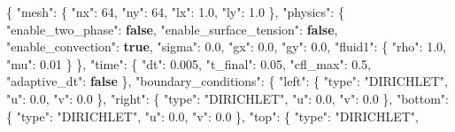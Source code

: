 \documentclass[
  10pt,
]{article}
\newenvironment{Shaded}{}{}
\newcommand{\DataTypeTok}[1]{\textcolor[rgb]{0.56,0.13,0.00}{#1}}
\newcommand{\DecValTok}[1]{\textcolor[rgb]{0.25,0.63,0.44}{#1}}
\newcommand{\FloatTok}[1]{\textcolor[rgb]{0.25,0.63,0.44}{#1}}
\newcommand{\FunctionTok}[1]{\textcolor[rgb]{0.02,0.16,0.49}{#1}}
\newcommand{\KeywordTok}[1]{\textcolor[rgb]{0.00,0.44,0.13}{\textbf{#1}}}
\newcommand{\StringTok}[1]{\textcolor[rgb]{0.25,0.44,0.63}{#1}}
\begin{document}
\begin{Shaded}
\begin{Highlighting}[]
\FunctionTok{\{}
  \DataTypeTok{"mesh"}\FunctionTok{:} \FunctionTok{\{}
    \DataTypeTok{"nx"}\FunctionTok{:} \DecValTok{64}\FunctionTok{,}
    \DataTypeTok{"ny"}\FunctionTok{:} \DecValTok{64}\FunctionTok{,}
    \DataTypeTok{"lx"}\FunctionTok{:} \FloatTok{1.0}\FunctionTok{,}
    \DataTypeTok{"ly"}\FunctionTok{:} \FloatTok{1.0}
  \FunctionTok{\},}
  \DataTypeTok{"physics"}\FunctionTok{:} \FunctionTok{\{}
    \DataTypeTok{"enable\_two\_phase"}\FunctionTok{:} \KeywordTok{false}\FunctionTok{,}
    \DataTypeTok{"enable\_surface\_tension"}\FunctionTok{:} \KeywordTok{false}\FunctionTok{,}
    \DataTypeTok{"enable\_convection"}\FunctionTok{:} \KeywordTok{true}\FunctionTok{,}
    \DataTypeTok{"sigma"}\FunctionTok{:} \FloatTok{0.0}\FunctionTok{,}
    \DataTypeTok{"gx"}\FunctionTok{:} \FloatTok{0.0}\FunctionTok{,}
    \DataTypeTok{"gy"}\FunctionTok{:} \FloatTok{0.0}\FunctionTok{,}
    \DataTypeTok{"fluid1"}\FunctionTok{:} \FunctionTok{\{}
      \DataTypeTok{"rho"}\FunctionTok{:} \FloatTok{1.0}\FunctionTok{,}
      \DataTypeTok{"mu"}\FunctionTok{:} \FloatTok{0.01}
    \FunctionTok{\}}
  \FunctionTok{\},}
  \DataTypeTok{"time"}\FunctionTok{:} \FunctionTok{\{}
    \DataTypeTok{"dt"}\FunctionTok{:} \FloatTok{0.005}\FunctionTok{,}
    \DataTypeTok{"t\_final"}\FunctionTok{:} \FloatTok{0.05}\FunctionTok{,}
    \DataTypeTok{"cfl\_max"}\FunctionTok{:} \FloatTok{0.5}\FunctionTok{,}
    \DataTypeTok{"adaptive\_dt"}\FunctionTok{:} \KeywordTok{false}
  \FunctionTok{\},}
  \DataTypeTok{"boundary\_conditions"}\FunctionTok{:} \FunctionTok{\{}
    \DataTypeTok{"left"}\FunctionTok{:} \FunctionTok{\{}
      \DataTypeTok{"type"}\FunctionTok{:} \StringTok{"DIRICHLET"}\FunctionTok{,}
      \DataTypeTok{"u"}\FunctionTok{:} \FloatTok{0.0}\FunctionTok{,}
      \DataTypeTok{"v"}\FunctionTok{:} \FloatTok{0.0}
    \FunctionTok{\},}
    \DataTypeTok{"right"}\FunctionTok{:} \FunctionTok{\{}
      \DataTypeTok{"type"}\FunctionTok{:} \StringTok{"DIRICHLET"}\FunctionTok{,}
      \DataTypeTok{"u"}\FunctionTok{:} \FloatTok{0.0}\FunctionTok{,}
      \DataTypeTok{"v"}\FunctionTok{:} \FloatTok{0.0}
    \FunctionTok{\},}
    \DataTypeTok{"bottom"}\FunctionTok{:} \FunctionTok{\{}
      \DataTypeTok{"type"}\FunctionTok{:} \StringTok{"DIRICHLET"}\FunctionTok{,}
      \DataTypeTok{"u"}\FunctionTok{:} \FloatTok{0.0}\FunctionTok{,}
      \DataTypeTok{"v"}\FunctionTok{:} \FloatTok{0.0}
    \FunctionTok{\},}
    \DataTypeTok{"top"}\FunctionTok{:} \FunctionTok{\{}
      \DataTypeTok{"type"}\FunctionTok{:} \StringTok{"DIRICHLET"}\FunctionTok{,}

\end{Highlighting}
\end{Shaded}
\end{document}

